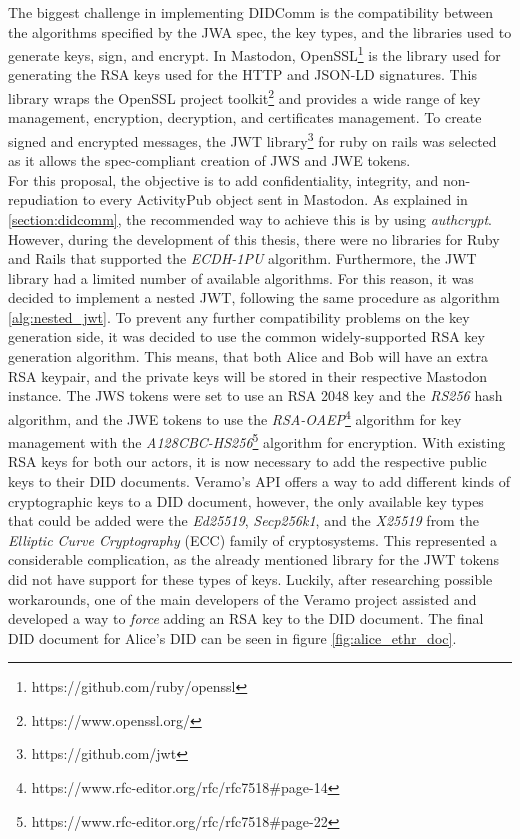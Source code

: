 The biggest challenge in implementing DIDComm is the compatibility between the algorithms specified by the JWA spec, the key types, and the libraries used to generate keys, sign, and encrypt. In Mastodon, OpenSSL\footnote{https://github.com/ruby/openssl} is the library used for generating the RSA keys used for the HTTP and JSON-LD signatures. This library wraps the OpenSSL project toolkit\footnote{https://www.openssl.org/} and provides a wide range of key management, encryption, decryption, and certificates management. To create signed and encrypted messages, the JWT library\footnote{https://github.com/jwt} for ruby on rails was selected as it allows the spec-compliant creation of JWS and JWE tokens.\\
For this proposal, the objective is to add confidentiality, integrity, and non-repudiation to every ActivityPub object sent in Mastodon. As explained in \autoref{section:didcomm}, the recommended way to achieve this is by using \emph{authcrypt}. However, during the development of this thesis, there were no libraries for Ruby and Rails that supported the \emph{ECDH-1PU} algorithm. Furthermore, the JWT library had a limited number of available algorithms. For this reason, it was decided to implement a nested JWT, following the same procedure as algorithm \ref{alg:nested_jwt}. To prevent any further compatibility problems on the key generation side, it was decided to use the common widely-supported RSA key generation algorithm. This means, that both Alice and Bob will have an extra RSA keypair, and the private keys will be stored in their respective Mastodon instance. The JWS tokens were set to use an RSA 2048 key and the \emph{RS256} hash algorithm, and the JWE tokens to use the \emph{RSA-OAEP}\footnote{https://www.rfc-editor.org/rfc/rfc7518\#page-14} algorithm for key management with the \emph{A128CBC-HS256}\footnote{https://www.rfc-editor.org/rfc/rfc7518\#page-22} algorithm for encryption.
With existing RSA keys for both our actors, it is now necessary to add the respective public keys to their DID documents. Veramo's API offers a way to add different kinds of cryptographic keys to a DID document, however, the only available key types that could be added were the \emph{Ed25519}, \emph{Secp256k1}, and the  \emph{X25519} from the \emph{Elliptic Curve Cryptography} (ECC) family of cryptosystems. This represented a considerable complication, as the already mentioned library for the JWT tokens did not have support for these types of keys. Luckily, after researching possible workarounds, one of the main developers of the Veramo project assisted and developed a way to \emph{force} adding an RSA key to the DID document. The final DID document for Alice's DID can be seen in figure \ref{fig:alice_ethr_doc}.

